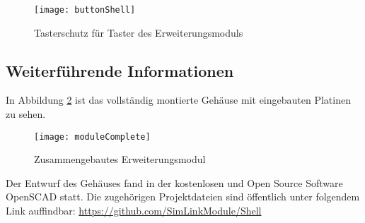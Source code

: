 \begin{figure}[h]
    \centering
    \texttt{[image: buttonShell]}
    \caption{Tasterschutz für Taster des Erweiterungsmoduls}
    \label{fig:buttonShell}
\end{figure}

\subsection{Weiterführende Informationen}
In Abbildung \ref{fig:moduleComplete} ist das vollständig montierte Gehäuse mit eingebauten Platinen zu sehen.

\begin{figure}[h]
    \centering
    \texttt{[image: moduleComplete]}
    \caption{Zusammengebautes Erweiterungsmodul}
    \label{fig:moduleComplete}
\end{figure}

Der Entwurf des Gehäuses fand in der kostenlosen und Open Source Software OpenSCAD \cite{aboutOpenScad} statt. Die zugehörigen Projektdateien sind öffentlich unter folgendem Link auffindbar: \url{https://github.com/SimLinkModule/Shell}